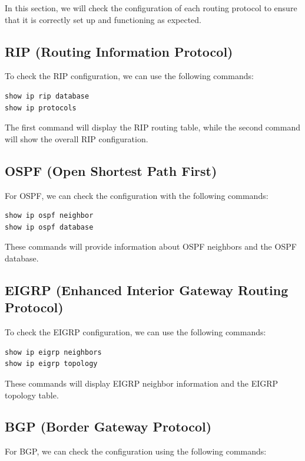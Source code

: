 \documentclass[12pt]{article}
\begin{document}
In this section, we will check the configuration of each routing protocol to ensure that it is correctly set up and functioning as expected.

\subsection{RIP (Routing Information Protocol)}

To check the RIP configuration, we can use the following commands:

\begin{verbatim}
show ip rip database
show ip protocols
\end{verbatim}

The first command will display the RIP routing table, while the second command will show the overall RIP configuration.

\subsection{OSPF (Open Shortest Path First)}

For OSPF, we can check the configuration with the following commands:

\begin{verbatim}
show ip ospf neighbor
show ip ospf database
\end{verbatim}

These commands will provide information about OSPF neighbors and the OSPF database.

\subsection{EIGRP (Enhanced Interior Gateway Routing Protocol)}

To check the EIGRP configuration, we can use the following commands:

\begin{verbatim}
show ip eigrp neighbors
show ip eigrp topology
\end{verbatim}

These commands will display EIGRP neighbor information and the EIGRP topology table.

\subsection{BGP (Border Gateway Protocol)}

For BGP, we can check the configuration using the following commands:
\end{document}
